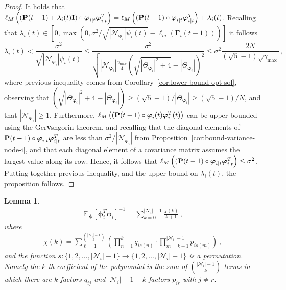 \documentclass[a4paper,notitlepage,onecolumn]{article}
\def\P{\mathds{P}}
\def\I{{\cal I}}
\def\v{{\bf v}}
\def\I{{\bf I}}
\def\P{{\bf P}}
\def\phib{\boldsymbol{\phi}}
\def\varphib{\boldsymbol{\varphi}}
\def\Gammab{\boldsymbol{\Gamma}}
\def\E{\,\mathds{E}\,}
\newtheorem{lemma}[theorem]{Lemma}
\numberwithin{equation}{section}
\begin{document}
\begin{proof}
It holds that $\ell_M \left((\P(t-1)+\lambda_i(t) \I) \circ \varphib_{i|t}\varphib_{i|t}^T \right)= \ell_M \left((\P(t-1)\circ \varphib_{i|t}\varphib_{i|t}^T \right) +\lambda_i(t)$.
Recalling that $\lambda_i(t)\in  \left[0, \max\left(0, \sigma^2/\sqrt{|\mathcal{N}_{\varphib_i}|
    \psi_i(t)} - \ell_m (\Gammab_i(t-1))\right)\right]$ it follows
 $$
        \lambda_i(t) < \frac{\sigma^2}{\sqrt{|\mathcal{N}_{\varphib_i}| \psi_i(t)}} \leq  \frac{\sigma^2}{\sqrt{|\mathcal{N}_{\varphib_i}| \frac{\gamma_{\max}}{4}\left( \sqrt{|\Theta_{\varphib_i}|^2 + 4} - |\Theta_{\varphib_i}| \right)^2}} \leq \sigma^2\frac{2N}{(\sqrt{5}-1)\sqrt{\gamma_{\max}}} \,,
    $$
where previous inequality comes from Corollary~\ref{cor:lower-bound-opt-sol}, observing that $\left( \sqrt{|\Theta_{\varphib_i}|^2 + 4} - |\Theta_{\varphib_i}| \right) \geq (\sqrt{5}-1)/|\Theta_{\varphib_i}| \geq (\sqrt{5}-1)/N$, and that $|\mathcal{N}_{\varphib_i}| \geq 1$. Furthermore, $\ell_M \left((\P(t-1)\circ \varphib_i(t)\varphib_i^T(t) \right)$ can be upper-bounded using the Ger\v{s}hgorin theorem, and recalling that the diagonal elements of $\P(t-1)\circ \varphib_{i|t}\varphib_{i|t}^T$ are less than $\sigma^2/ |\mathcal{N}_{\varphib_i}|$ from Proposition~\ref{cor:bound-variance-node-i}, and that each diagonal element of a covariance matrix assumes the largest value along its row. Hence, it follows that $\ell_M \left((\P(t-1)\circ \varphib_{i|t}\varphib_{i|t}^T \right) \leq \sigma^2$.
Putting together previous inequality, and the upper bound on $\lambda_i(t)$, the proposition follows.

\end{proof}
\begin{lemma} \label{lemma:boundexpt}
\begin{align}
    \E_{\phib} [\phib_i^T\phib_i]^{-1} = \sum_{k = 0}^{|\mathcal{N}_{i}|-1} \frac{\chi(k)}{k+1} \,,
\end{align}
where
\begin{align}
    \chi(k) = \sum_{\ell = 1}^{|\mathcal{N}_{i}| - 1 \choose k} \left(\prod_{n = 1}^k q_{is(n)}
     \cdot \prod_{m = k+1}^{|\mathcal{N}_{i}| - 1} p_{is(m)}\right) \,,
    \label{eq:poly_coeff}
\end{align}
and the function $s:\{1,2,\dots,|\mathcal{N}_{i}| - 1\}
\rightarrow \{1,2,\dots,|\mathcal{N}_{i}| - 1\}$ is a permutation.
Namely the $k$-th coefficient of the polynomial is the sum of
$|\mathcal{N}_{i}| - 1 \choose k$ terms in which there are $k$
factors $q_{ij}$ and $|\mathcal{N}_{i}|- 1 - k$ factors $p_{ir}$
with $j\neq r$.
\end{lemma}
\end{document}
